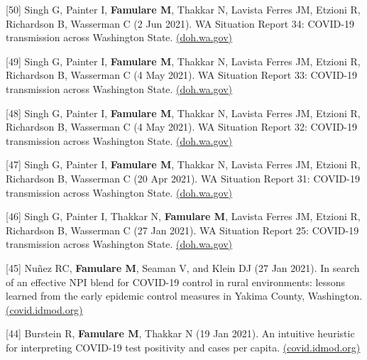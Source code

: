 \documentclass{article}
\begin{document}
\begin{llist}
\begin{items}
	\item[{[50]}] Singh G, Painter I, \textbf{Famulare M}, Thakkar N,  Lavista Ferres JM, Etzioni R, Richardson B, Wasserman C (2 Jun 2021). WA Situation Report 34: COVID-19 transmission across Washington State. \href{https://www.doh.wa.gov/Portals/1/Documents/1600/coronavirus/data-tables/820-114-SituationReport-20210603.pdf}{(doh.wa.gov)}
	
	\item[{[49]}] Singh G, Painter I, \textbf{Famulare M}, Thakkar N,  Lavista Ferres JM, Etzioni R, Richardson B, Wasserman C (4 May 2021). WA Situation Report 33: COVID-19 transmission across Washington State. \href{https://www.doh.wa.gov/Portals/1/Documents/1600/coronavirus/data-tables/820-114-SituationReport-20210519.pdf}{(doh.wa.gov)}
	
	\item[{[48]}] Singh G, Painter I, \textbf{Famulare M}, Thakkar N,  Lavista Ferres JM, Etzioni R, Richardson B, Wasserman C (4 May 2021). WA Situation Report 32: COVID-19 transmission across Washington State. \href{https://www.doh.wa.gov/Portals/1/Documents/1600/coronavirus/data-tables/820-114-SituationReport-20210505.pdf}{(doh.wa.gov)}
		
	\item[{[47]}] Singh G, Painter I, \textbf{Famulare M}, Thakkar N,  Lavista Ferres JM, Etzioni R, Richardson B, Wasserman C (20 Apr 2021). WA Situation Report 31: COVID-19 transmission across Washington State. \href{https://www.doh.wa.gov/Portals/1/Documents/1600/coronavirus/data-tables/820-114-SituationReport-20210421.pdf}{(doh.wa.gov)}
	
	\item[{[46]}] Singh G, Painter I, Thakkar N, \textbf{Famulare M}, Lavista Ferres JM, Etzioni R, Richardson B, Wasserman C (27 Jan 2021). WA Situation Report 25: COVID-19 transmission across Washington State. \href{https://www.doh.wa.gov/Portals/1/Documents/1600/coronavirus/data-tables/820-114-SituationReport-01272021.pdf}{(doh.wa.gov)}
	
	\item[{[45]}] Nu\~nez RC, \textbf{Famulare M}, Seaman V, and Klein DJ (27 Jan 2021). In search of an effective NPI blend for COVID-19 control in rural environments: lessons learned from the early epidemic control measures in Yakima County, Washington. \href{https://iazpvnewgrp01.blob.core.windows.net/source/2021-02/reports/pdf/Effect-of-NPIs-in-Yakima-County.pdf}{(covid.idmod.org)}
	
	\item[{[44]}] Burstein R, \textbf{Famulare M}, Thakkar N (19 Jan 2021). An intuitive heuristic for interpreting COVID-19 test positivity and cases per capita. \href{https://iazpvnewgrp01.blob.core.windows.net/source/2021-03/reports/pdf/An_intuitive_heuristic_for_interpreting_COVID-19_test_positivity_and_cases_per_capita.pdf}{(covid.idmod.org)}
	

\end{items}
\end{llist}
\end{document}
